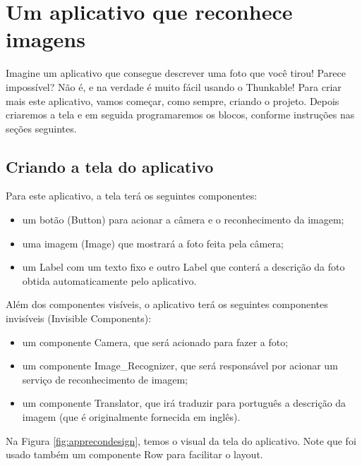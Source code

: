 \documentclass[11pt,fleqn]{book} %
\begin{document}




\section{Um aplicativo que reconhece imagens}

Imagine um aplicativo que consegue descrever uma foto que você tirou! Parece impossível? Não é, e na verdade é muito fácil usando o Thunkable!
Para criar mais este aplicativo, vamos começar, como sempre, criando o projeto. Depois criaremos a tela e em seguida programaremos os blocos, conforme instruções nas seções seguintes.

\subsection{Criando a tela do aplicativo}

Para este aplicativo, a tela terá os seguintes componentes: 
\begin{itemize}
    \item um botão (Button) para acionar a câmera e o reconhecimento da imagem;
    \item uma imagem (Image) que mostrará a foto feita pela câmera;
    \item um Label com um texto fixo e outro Label que conterá a descrição da foto obtida automaticamente pelo aplicativo.
\end{itemize}
Além dos componentes visíveis, o aplicativo terá os seguintes componentes invisíveis (Invisible Components):
\begin{itemize}
    \item um componente Camera, que será acionado para fazer a foto;
    \item um componente Image\_Recognizer, que será responsável por acionar um serviço de reconhecimento de imagem;
    \item um componente Translator, que irá traduzir para português a descrição da imagem (que é originalmente fornecida em inglês).
\end{itemize}

Na Figura \ref{fig:apprecondesign}, temos o visual da tela do aplicativo. Note que foi usado também um componente Row para facilitar o layout.
\end{document}
